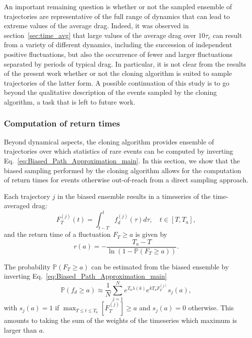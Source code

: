 \documentclass{jfm}
\begin{document}
An important remaining question is whether or not the sampled ensemble of trajectories are representative of the full range of dynamics that can lead to extreme values of the average drag.
Indeed, it was observed in section~\ref{sec:time_avg} that large values of the average drag over $10\tau_c$ can result from a variety of different
dynamics, including the succession of independent positive fluctuations, but also the occurrence of fewer and larger fluctuations separated by periods of typical drag.
In particular, it is not clear from the results of the present work whether or not the cloning algorithm is suited to sample trajectories of the latter form.
A possible continuation of this study is to go beyond the qualitative description of the events sampled by the cloning algorithm, a task that is left to future work.

\subsubsection{Computation of return times}
\label{sec:return_times}

Beyond dynamical aspects, the cloning algorithm provides ensemble of trajectories over which statistics of rare events can be computed by inverting Eq.~\eqref{eq:Biased_Path_Approximation_main}.
In this section, we show that the biased sampling performed by the cloning algorithm allows for the computation of return times for events otherwise out-of-reach from a direct sampling approach.

Each trajectory $j$ in the biased ensemble results in a timeseries of the time-averaged drag:
\begin{equation}
\label{eq:time_averaged}
F_T^{(j)}(t) = \int_{t-T}^{t}f_d^{(j)}(\tau)d\tau, \quad t\in [T,T_a]  ,
\end{equation}
and the return time of a fluctuation $F_T \geq a$ is given by~\citep{lestang_computing_2018}
\begin{equation}
r(a) = - \frac{T_a - T}{\ln (1-\mathbb{P}(F_T \geq a))}.
\end{equation}


The probability $\mathbb{P}(F_T \geq a)$ can be estimated from the biased ensemble by inverting Eq.~\eqref{eq:Biased_Path_Approximation_main}
\begin{equation}
  \mathbb{P}(f_d \geq a) \approx \frac{1}{N}\sum_{j=1}^{N}e^{T_a \lambda(k)}e^{kT_aF_T^{(j)}}s_j(a),
\end{equation}
with $s_j(a) = 1$ if $\max_{T\leq t \leq T_a}[F_T^{(j)}] \geq a$ and $s_j(a) = 0$ otherwise. This amounts to taking the sum of the weights of the timeseries which maximum is larger than $a$.
\end{document}

